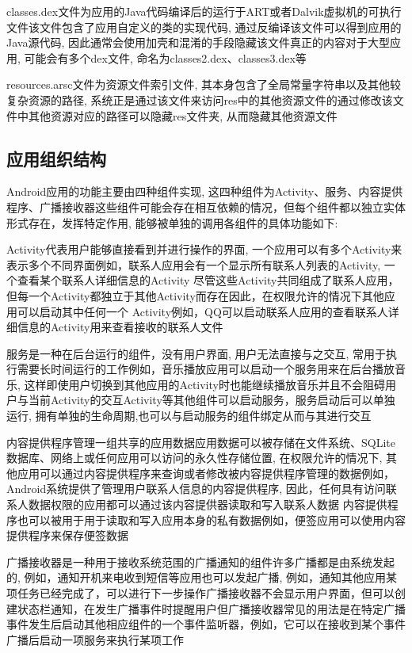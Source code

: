 classes.dex文件为应用的Java代码编译后的运行于ART或者Dalvik虚拟机的可执行文件\juhao 该文件包含了应用自定义的类的实现代码, 通过反编译该文件可以得到应用的Java源代码, 因此通常会使用加壳和混淆的手段隐藏该文件真正的内容\juhao 对于大型应用, 可能会有多个dex文件, 命名为classes2.dex、classes3.dex等\juhao

resources.arsc文件为资源文件索引文件, 其本身包含了全局常量字符串以及其他较复杂资源的路径, 系统正是通过该文件来访问res中的其他资源文件的\juhao 通过修改该文件中其他资源对应的路径可以隐藏res文件夹, 从而隐藏其他资源文件\juhao

\subsection{应用组织结构}
Android应用的功能主要由四种组件实现, 这四种组件为Activity、服务、内容提供程序、广播接收器\juhao 这些组件可能会存在相互依赖的情况，但每个组件都以独立实体形式存在，发挥特定作用, 能够被单独的调用\juhao 各组件的具体功能如下:

Activity代表用户能够直接看到并进行操作的界面, 一个应用可以有多个Activity来表示多个不同界面\juhao 例如，联系人应用会有一个显示所有联系人列表的Activity, 一个查看某个联系人详细信息的Activity\juhao 
尽管这些Activity共同组成了联系人应用，但每一个Activity都独立于其他Activity而存在\juhao 因此，在权限允许的情况下其他应用可以启动其中任何一个 Activity\juhao 例如，QQ可以启动联系人应用的查看联系人详细信息的Activity用来查看接收的联系人文件\juhao

服务是一种在后台运行的组件，没有用户界面, 用户无法直接与之交互, 常用于执行需要长时间运行的工作\juhao 例如，音乐播放应用可以启动一个服务用来在后台播放音乐, 这样即使用户切换到其他应用的Activity时也能继续播放音乐并且不会阻碍用户与当前Activity的交互\juhao  Activity等其他组件可以启动服务，服务启动后可以单独运行, 拥有单独的生命周期,也可以与启动服务的组件绑定从而与其进行交互\juhao

内容提供程序管理一组共享的应用数据\juhao 应用数据可以被存储在文件系统、SQLite 数据库、网络上或任何应用可以访问的永久性存储位置, 在权限允许的情况下, 其他应用可以通过内容提供程序来查询或者修改被内容提供程序管理的数据\juhao 例如，Android系统提供了管理用户联系人信息的内容提供程序, 因此，任何具有访问联系人数据权限的应用都可以通过该内容提供器读取和写入联系人数据\juhao
内容提供程序也可以被用于用于读取和写入应用本身的私有数据\juhao 例如，便签应用可以使用内容提供程序来保存便签数据\juhao

广播接收器是一种用于接收系统范围的广播通知的组件\juhao 许多广播都是由系统发起的, 例如，通知开机\dunhao 来电\dunhao 收到短信等\juhao 应用也可以发起广播, 例如，通知其他应用某项任务已经完成了，可以进行下一步操作\juhao 广播接收器不会显示用户界面，但可以创建状态栏通知，在发生广播事件时提醒用户\juhao 但广播接收器常见的用法是在特定广播事件发生后启动其他相应组件的一个事件监听器，例如，它可以在接收到某个事件广播后启动一项服务来执行某项工作\juhao

